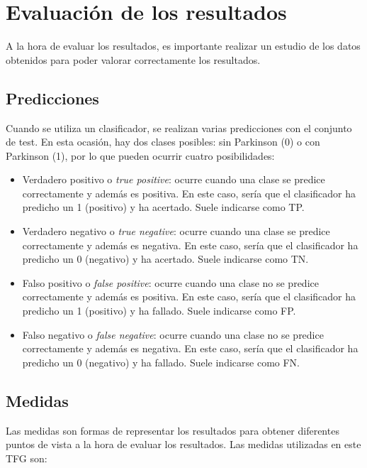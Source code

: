 \section{Evaluación de los resultados}
A la hora de evaluar los resultados, es importante realizar un estudio de los datos obtenidos para poder valorar correctamente los resultados.

\subsection{Predicciones}
Cuando se utiliza un clasificador, se realizan varias predicciones con el conjunto de test. En esta ocasión, hay dos clases posibles: sin Parkinson (0) o con Parkinson (1), por lo que pueden ocurrir cuatro posibilidades:

\begin{itemize}
	\item Verdadero positivo o \textit{true positive}: ocurre cuando una clase se predice correctamente y además es positiva. En este caso, sería que el clasificador ha predicho un 1 (positivo) y ha acertado. Suele indicarse como TP.
	\item Verdadero negativo o \textit{true negative}: ocurre cuando una clase se predice correctamente y además es negativa. En este caso, sería que el clasificador ha predicho un 0 (negativo) y ha acertado. Suele indicarse como TN.
	\item Falso positivo o \textit{false positive}: ocurre cuando una clase no se predice correctamente y además es positiva. En este caso, sería que el clasificador ha predicho un 1 (positivo) y ha fallado. Suele indicarse como FP.
	\item Falso negativo o \textit{false negative}: ocurre cuando una clase no se predice correctamente y además es negativa. En este caso, sería que el clasificador ha predicho un 0 (negativo) y ha fallado. Suele indicarse como FN.
	
\end{itemize}

\subsection{Medidas} \label{medidas}
Las medidas son formas de representar los resultados para obtener diferentes puntos de vista a la hora de evaluar los resultados. Las medidas utilizadas en este TFG son:

